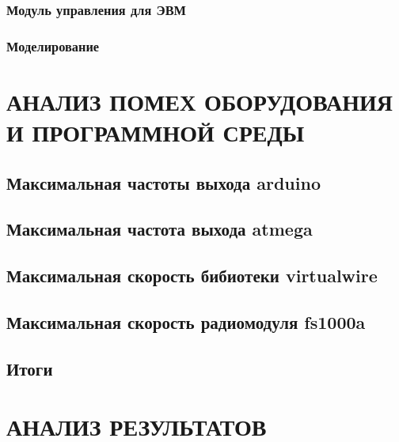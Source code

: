         \subsubsection{Модуль управления для ЭВМ}
        

        \subsubsection{Моделирование}
        

\section{АНАЛИЗ ПОМЕХ ОБОРУДОВАНИЯ И ПРОГРАММНОЙ СРЕДЫ}
\label{sec:taskfreq}


    \subsection{Максимальная частоты выхода arduino}
    

    \subsection{Максимальная частота выхода atmega}
    

    \subsection{Максимальная скорость бибиотеки virtualwire}
    \label{sec:virtualwirefreq}
    

    \subsection{Максимальная скорость радиомодуля fs1000a}
    \label{sec:fs1000a}
    


    \newpage
    \subsection{Итоги}
    

\section{АНАЛИЗ РЕЗУЛЬТАТОВ}


